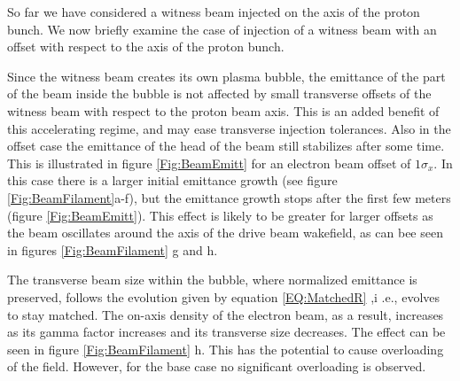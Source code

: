\documentclass[aps,prstab,reprint,amsmath,amssymb,groupedaddress,onecolumn]{revtex4-1}
\begin{document}
So far we have considered a witness beam injected on the axis of the proton bunch. %
We now briefly examine the case of injection of a witness beam with an offset with respect to the axis of the proton bunch. %

Since the witness beam creates its own plasma bubble, the emittance of the part of the beam inside the
bubble is not affected by small transverse offsets of the witness beam with respect to the proton beam axis. This is an added benefit of this 
accelerating regime, and may ease transverse injection tolerances. Also in the offset case the emittance of the head of the beam still stabilizes after some time.
This is illustrated in figure \ref{Fig:BeamEmitt} for an electron beam offset of $1\sigma_{x}$. In this case there is a
larger initial emittance growth (see figure \ref{Fig:BeamFilament}a-f),
 but the emittance growth stops after the first
few meters (figure \ref{Fig:BeamEmitt}). This effect is likely to be greater for larger offsets as the beam oscillates
around the axis of the drive beam wakefield, as can bee seen %
in figures \ref{Fig:BeamFilament}%
g and h.

The transverse beam size within the bubble, where normalized emittance is preserved, follows the evolution given by
equation \ref{EQ:MatchedR}%
,i .e., evolves to stay matched. The on-axis density of the electron
beam, as a result, increases as its gamma factor increases and its transverse size decreases. The effect can be seen in
figure \ref{Fig:BeamFilament} h. This has the potential to cause overloading of the field. However, for the base case
no significant overloading %
is observed.  
\end{document}
